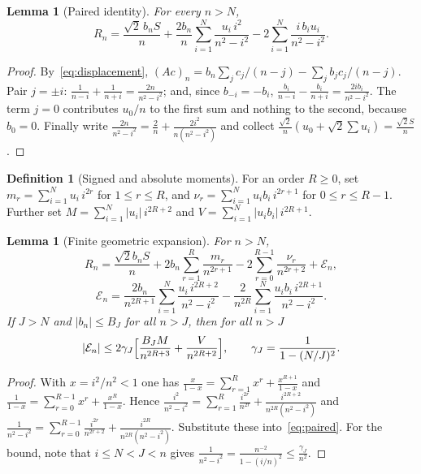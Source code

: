 \documentclass[11pt,a4paper]{article}
\newtheorem{lemma}[theorem]{Lemma}
\theoremstyle{definition}
\newtheorem{definition}[theorem]{Definition}
\newcommand{\abs}[1]{\lvert #1\rvert}
\begin{document}
\begin{lemma}[Paired identity]\label{lem:paired}
For every $n>N$,
\begin{equation}\label{eq:paired}
R_n=\frac{\sqrt2\,b_nS}n+\frac{2b_n}n\sum_{i=1}^N\frac{u_i\,i^2}{n^2-i^2}-2\sum_{i=1}^N\frac{i\,b_iu_i}{n^2-i^2}.
\end{equation}
\end{lemma}

\begin{proof}
By~\eqref{eq:displacement},
$(Ac)_n=b_n\sum_jc_j/(n-j)-\sum_jb_jc_j/(n-j)$. Pair $j=\pm i$:
$\frac1{n-i}+\frac1{n+i}=\frac{2n}{n^2-i^2}$; and, since $b_{-i}=-b_i$,
$\frac{b_i}{n-i}-\frac{b_i}{n+i}=\frac{2ib_i}{n^2-i^2}$. The term $j=0$
contributes $u_0/n$ to the first sum and nothing to the second, because
$b_0=0$. Finally write $\frac{2n}{n^2-i^2}=\frac2n+\frac{2i^2}{n(n^2-i^2)}$ and
collect $\frac{\sqrt2}{n}(u_0+\sqrt2\sum u_i)=\frac{\sqrt2S}n$.
\end{proof}

\begin{definition}[Signed and absolute moments]
For an order $R\ge0$, set
$m_r=\sum_{i=1}^Nu_i\,i^{2r}$ for $1\le r\le R$, and
$\nu_r=\sum_{i=1}^Nu_ib_i\,i^{2r+1}$ for $0\le r\le R-1$. Further set
$M=\sum_{i=1}^N\abs{u_i}\,i^{2R+2}$ and $V=\sum_{i=1}^N\abs{u_ib_i}\,i^{2R+1}$.
\end{definition}

\begin{lemma}[Finite geometric expansion]\label{lem:geometric}
For $n>N$,
\[
R_n=\frac{\sqrt2b_nS}n+2b_n\sum_{r=1}^R\frac{m_r}{n^{2r+1}}-2\sum_{r=0}^{R-1}\frac{\nu_r}{n^{2r+2}}+\mathcal E_n,
\]
\[
\mathcal E_n=\frac{2b_n}{n^{2R+1}}\sum_{i=1}^N\frac{u_i\,i^{2R+2}}{n^2-i^2}-\frac2{n^{2R}}\sum_{i=1}^N\frac{u_ib_i\,i^{2R+1}}{n^2-i^2}.
\]
If $J>N$ and $\abs{b_n}\le B_J$ for all $n>J$, then for all $n>J$
\[
\abs{\mathcal E_n}\le2\gamma_J\Bigl[\frac{B_JM}{n^{2R+3}}+\frac V{n^{2R+2}}\Bigr],\qquad\gamma_J=\frac1{1-(N/J)^2}.
\]
\end{lemma}

\begin{proof}
With $x=i^2/n^2<1$ one has $\frac x{1-x}=\sum_{r=1}^Rx^r+\frac{x^{R+1}}{1-x}$ and
$\frac1{1-x}=\sum_{r=0}^{R-1}x^r+\frac{x^R}{1-x}$. Hence
$\frac{i^2}{n^2-i^2}=\sum_{r=1}^R\frac{i^{2r}}{n^{2r}}+\frac{i^{2R+2}}{n^{2R}(n^2-i^2)}$
and
$\frac1{n^2-i^2}=\sum_{r=0}^{R-1}\frac{i^{2r}}{n^{2r+2}}+\frac{i^{2R}}{n^{2R}(n^2-i^2)}$.
Substitute these into~\eqref{eq:paired}. For the bound, note that $i\le N<J<n$
gives $\frac1{n^2-i^2}=\frac{n^{-2}}{1-(i/n)^2}\le\frac{\gamma_J}{n^2}$.
\end{proof}
\end{document}
